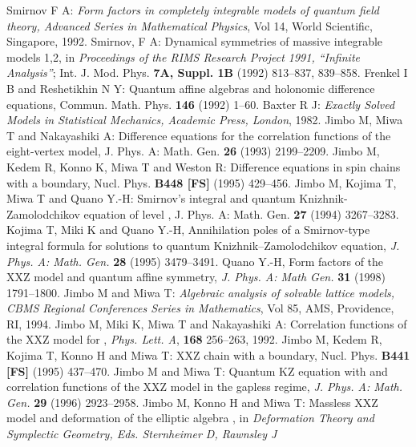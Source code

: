 \documentclass[a4paper,10pt]{article}
\begin{document}
{\begin{thebibliography}{99}
Smirnov F A:
{\it Form factors in completely integrable models of
quantum field theory, Advanced Series in Mathematical 
Physics}, Vol 14, World Scientific, Singapore, 1992.
 Smirnov, F A: Dynamical 
symmetries of massive integrable models 1,2, 
in {\it Proceedings of the RIMS Research Project 1991, 
``Infinite Analysis''}; 
Int. J. Mod. Phys. {\bf 7A, Suppl. 1B} (1992) 813--837, 
839--858.
Frenkel I B and Reshetikhin N Y:
Quantum affine algebras and holonomic difference equations,
Commun. Math. Phys. {\bf 146} (1992) 1--60.
Baxter R J: {\it Exactly Solved Models 
in Statistical Mechanics, Academic Press, London}, 1982.
Jimbo M, Miwa T and Nakayashiki A:
Difference equations for the correlation functions of
the eight-vertex model, J. Phys. A: Math. Gen. 
{\bf 26} (1993) 2199--2209. 
Jimbo M, Kedem R, Konno K, Miwa T and
Weston R: Difference equations in spin chains with a boundary,
Nucl. Phys. {\bf B448 [FS]} (1995) 429--456.
Jimbo M, Kojima T, Miwa T 
and Quano Y.-H: Smirnov's integral and quantum 
Knizhnik-Zamolodchikov equation of level \coordHE{}, 
J. Phys. A: Math. Gen. {\bf 27} (1994) 3267--3283. 
Kojima T, Miki K and Quano Y.-H, 
Annihilation poles of a Smirnov-type integral formula 
for solutions to quantum Knizhnik--Zamolodchikov 
equation, {\it J. Phys. A: Math. Gen.} 
{\bf 28} (1995) 3479--3491.
Quano Y.-H, Form factors of the 
XXZ model and quantum affine symmetry, 
{\it J. Phys. A: Math Gen.} {\bf 31} (1998) 
1791--1800. 
 Jimbo M and Miwa T: 
{\it Algebraic analysis of solvable lattice models, 
CBMS Regional Conferences Series in Mathematics}, 
Vol 85, AMS, Providence, RI, 1994. 
Jimbo M, Miki K, Miwa T and Nakayashiki A: 
Correlation functions of the XXZ model for \coordHE{}, 
{\it Phys. Lett. A}, {\bf 168} 256--263, 1992.
Jimbo M, Kedem R, Kojima T, Konno H and
Miwa T: XXZ chain with a boundary, 
Nucl. Phys. {\bf B441 [FS]} (1995) 437--470.
Jimbo M and Miwa T: 
Quantum KZ equation with \coordHE{} and correlation functions 
of the XXZ model in the gapless regime, 
{\it J. Phys. A: Math. Gen.} {\bf 29} (1996) 2923--2958. 
Jimbo M, Konno H and Miwa T: Massless 
XXZ model and deformation of the elliptic algebra 
\coordHE{}, in {\it Deformation 
Theory and Symplectic Geometry, Eds. Sternheimer D, Rawnsley J 
}
\end{thebibliography}}
\end{document}
